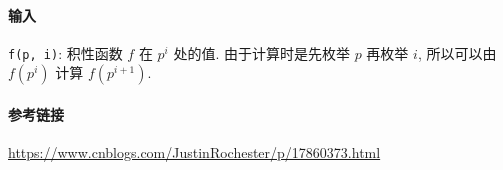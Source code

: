 \paragraph{输入}

\verb|f(p, i)|: 积性函数 \(f\) 在 \(p^i\) 处的值. 由于计算时是先枚举 \(p\) 再枚举 \(i\), 所以可以由 \(f(p^i)\) 计算 \(f(p^{i+1})\).

\paragraph{参考链接}

\url{https://www.cnblogs.com/JustinRochester/p/17860373.html}
